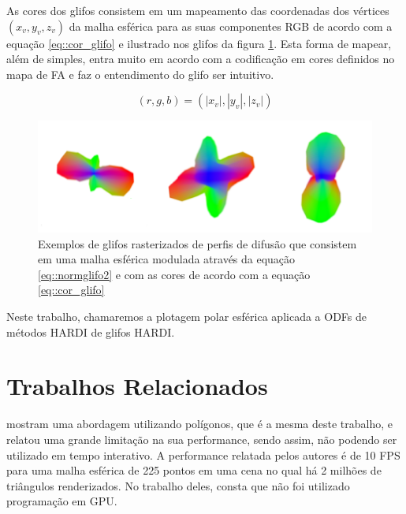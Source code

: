\documentclass[
    12pt,                %
    oneside,            %
    a4paper,            %
    english,            %
    french,                %
    spanish,            %
    brazil                %
    ]{abntex2}
\begin{document}
As cores dos glifos consistem em um mapeamento das coordenadas dos vértices $(x_v,y_v,z_v)$ da malha esférica para as suas componentes RGB de acordo com a equação \ref{eq::cor_glifo} e ilustrado nos glifos da figura \ref{fig::glifo_ilustrado}. Esta forma de mapear, além de simples, entra muito em acordo com a codificação em cores definidos no mapa de FA e faz o entendimento do glifo ser intuitivo. %

\begin{equation}
\label{eq::cor_glifo}
    (r,g,b) = (|x_v|,|y_v|,|z_v|)
\end{equation}

\begin{figure}[ht]

    \centering
    \includegraphics[width=.8\linewidth, angle=0]{figs/Esquema_Glifo/Glifos3Ex.png}
    \caption{Exemplos de glifos rasterizados de perfis de difusão que consistem em uma malha esférica modulada através da equação \ref{eq::normglifo2} e com as cores de acordo com a equação \ref{eq::cor_glifo}}
    \label{fig::glifo_ilustrado}
   \hspace{1pt}
\end{figure}

Neste trabalho, chamaremos a plotagem polar esférica aplicada a ODFs de métodos HARDI de glifos HARDI.

\section{Trabalhos Relacionados}

 mostram uma abordagem utilizando polígonos, que é a mesma deste trabalho, e relatou uma grande limitação na sua performance, sendo assim, não podendo ser utilizado em tempo interativo. A performance relatada pelos autores é de 10 FPS para uma malha esférica de 225 pontos em uma cena no qual há 2 milhões de triângulos renderizados. No trabalho deles, consta que não foi utilizado programação em GPU.
\end{document}
